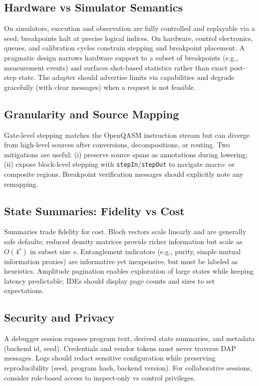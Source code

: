 \documentclass[12pt]{article}
\begin{document}
\begin{itemize}
\subsection{Hardware vs Simulator Semantics}

On simulators, execution and observation are fully controlled and replayable via a seed; breakpoints halt at precise logical indices. On hardware, control electronics, queues, and calibration cycles constrain stepping and breakpoint placement. A pragmatic design narrows hardware support to a subset of breakpoints (e.g., measurement events) and surfaces shot-based statistics rather than exact post-step state. The adapter should advertise limits via capabilities and degrade gracefully (with clear messages) when a request is not feasible.

\subsection{Granularity and Source Mapping}

Gate-level stepping matches the OpenQASM instruction stream but can diverge from high-level sources after conversions, decompositions, or routing. Two mitigations are useful: (i) preserve source spans as annotations during lowering; (ii) expose block-level stepping with \texttt{stepIn}/\texttt{stepOut} to navigate macro- or composite regions. Breakpoint verification messages should explicitly note any remapping.

\subsection{State Summaries: Fidelity vs Cost}

Summaries trade fidelity for cost. Bloch vectors scale linearly and are generally safe defaults; reduced density matrices provide richer information but scale as $O(4^s)$ in subset size $s$. Entanglement indicators (e.g., purity, simple mutual information proxies) are informative yet inexpensive, but must be labeled as heuristics. Amplitude pagination enables exploration of large states while keeping latency predictable; IDEs should display page counts and sizes to set expectations.

\subsection{Security and Privacy}

A debugger session exposes program text, derived state summaries, and metadata (backend id, seed). Credentials and vendor tokens must never traverse DAP messages. Logs should redact sensitive configuration while preserving reproducibility (seed, program hash, backend version). For collaborative sessions, consider role-based access to inspect-only vs control privileges.


\end{itemize}
\end{document}
